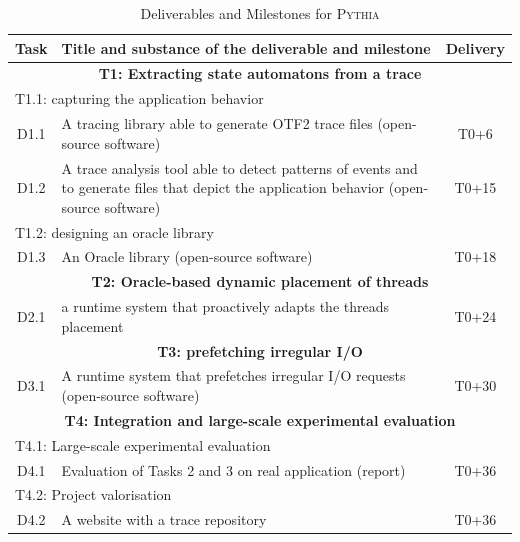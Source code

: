 \documentclass[a4paper,11pt,defblank]{article}
\newcommand{\pname}{\textsc{Pythia}\xspace}
\begin{document}
\begin{table}[H]
  \begin{center}
    \begin{tabular} {|c|p{12cm}|c|}\hline

\cellcolor{Tan}\textbf{Task} & \cellcolor{Tan}\textbf{Title and substance of the deliverable and milestone} & \cellcolor{Tan}\textbf{Delivery}\\\hline

      \multicolumn{3}{|c|}{\cellcolor{NavyBlue}\textbf{T1: Extracting state automatons from a trace}  }\\\hline
      \multicolumn{3}{|l|}{T1.1: capturing the application behavior  }\\\hline
      D1.1& A tracing library able to generate OTF2 trace files (open-source software) & T0+6\\
      D1.2& A trace analysis tool able to detect patterns
 of events and to generate files that depict the application
 behavior (open-source software) & T0+15\\\hline\hline

 \multicolumn{3}{|l|}{T1.2: designing an oracle library  }\\\hline
 D1.3&An Oracle library (open-source software)&T0+18\\\hline\hline

 \multicolumn{3}{|c|}{\cellcolor{NavyBlue}\textbf{T2: Oracle-based dynamic placement of threads}  } \\\hline
D2.1 & a runtime system that proactively adapts the threads placement& T0+24\\\hline\hline
\multicolumn{3}{|c|}{\cellcolor{NavyBlue}\textbf{T3: prefetching irregular I/O}  }\\\hline
D3.1& A runtime system that prefetches irregular I/O
    requests (open-source software) & T0+30\\\hline\hline

    \multicolumn{3}{|c|}{\cellcolor{NavyBlue}\textbf{T4: Integration and large-scale experimental evaluation}  } \\\hline
    \multicolumn{3}{|l|}{T4.1: Large-scale experimental evaluation }\\\hline
    D4.1& Evaluation of Tasks 2 and 3 on real application (report) &   T0+36\\\hline\hline
    \multicolumn{3}{|l|}{T4.2: Project valorisation  }\\\hline

 D4.2 & A website with a trace repository &   T0+36\\\hline

    \end{tabular}
  \end{center}
  \caption{Deliverables and Milestones for \pname}
  \label{tab:deliverables}
\end{table}
\end{document}
